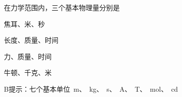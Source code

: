 在力学范围内，三个基本物理量分别是\paren[B]
\begin{choices}
    \item 焦耳、米、秒
    \item 长度、质量、时间
    \item 力、质量、时间
    \item 牛顿、千克、米
\end{choices}
\begin{answer}
    B\qquad 提示：七个基本单位\qty{}{m}、\qty{}{kg}、\qty{}{s}、\qty{}{A}、\qty{}{T}、\qty{}{mol}、\qty{}{cd}
\end{answer}